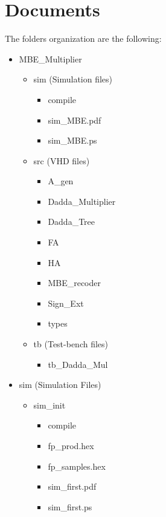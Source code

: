 \chapter{Documents}
\label{appendix1}

The folders organization are the following:\\
\begin{itemize}
    \item MBE\_Multiplier
    \begin{itemize}
        \item sim (Simulation files)
         \begin{itemize}
            \item compile 
            \item sim\_MBE.pdf
            \item sim\_MBE.ps
        \end{itemize}
        \item src (VHD files)
         \begin{itemize}
            \item A\_gen
            \item Dadda\_Multiplier
            \item Dadda\_Tree
            \item FA
            \item HA
            \item MBE\_recoder
            \item Sign\_Ext
            \item types
        \end{itemize}
        \item tb (Test-bench files)
         \begin{itemize}
            \item tb\_Dadda\_Mul 
        \end{itemize}
    \end{itemize}
    \item sim (Simulation Files)
    \begin{itemize}
        \item sim\_init
         \begin{itemize}
            \item compile
            \item fp\_prod.hex
            \item fp\_samples.hex
            \item sim\_first.pdf
            \item sim\_first.ps

\end{itemize}
\end{itemize}
\end{itemize}
